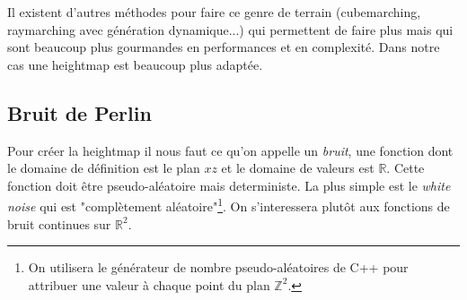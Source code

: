 \documentclass[11pt]{article} %
\begin{document}
Il existent d'autres méthodes pour faire ce genre de terrain (cubemarching, raymarching avec génération dynamique...) qui permettent de faire plus mais qui sont beaucoup plus gourmandes en performances et en complexité. Dans notre cas une heightmap est beaucoup plus adaptée.

\subsection{Bruit de Perlin}

Pour créer la heightmap il nous faut ce qu'on appelle un \textit{bruit}, une fonction dont le domaine de définition est le plan $xz$ et le domaine de valeurs est $\mathbb{R}$. Cette fonction doit être pseudo-aléatoire mais deterministe. La plus simple est le \textit{white noise} qui est "complètement aléatoire"\footnote{On utilisera le générateur de nombre pseudo-aléatoires de C++ pour attribuer une valeur à chaque point du plan $\mathbb{Z}^2$.}. On s'interessera plutôt aux fonctions de bruit continues sur $\mathbb{R}^2$.
\end{document}

